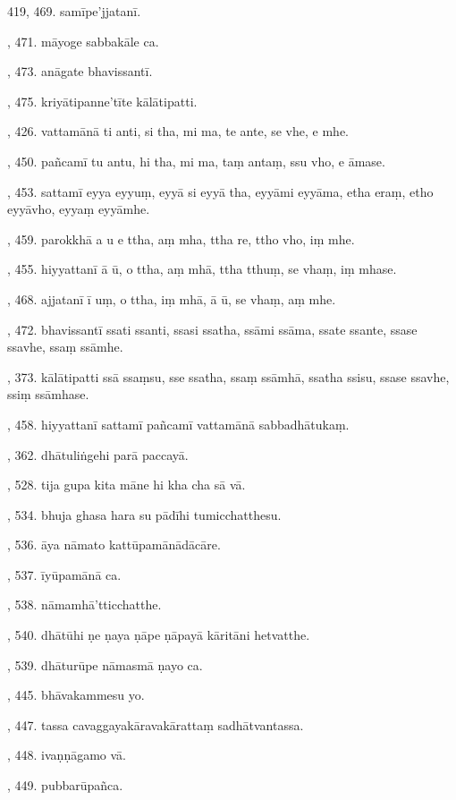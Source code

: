 419, 469. samīpe’jjatanī.\par {}, 471. māyoge sabbakāle ca.\par {}, 473. anāgate bhavissantī.\par {}, 475. kriyātipanne’tīte kālātipatti.\par {}, 426. vattamānā ti anti, si tha, mi ma, te ante, se vhe, e mhe.\par {}, 450. pañcamī tu antu, hi tha, mi ma, taṃ antaṃ, ssu vho, e āmase.\par {}, 453. sattamī eyya eyyuṃ, eyyā si eyyā tha, eyyāmi eyyāma, etha eraṃ, etho eyyāvho, eyyaṃ eyyāmhe.\par {}, 459. parokkhā a u e ttha, aṃ mha, ttha re, ttho vho, iṃ mhe.\par {}, 455. hiyyattanī ā ū, o ttha, aṃ mhā, ttha tthuṃ, se vhaṃ, iṃ mhase.\par {}, 468. ajjatanī ī uṃ, o ttha, iṃ mhā, ā ū, se vhaṃ, aṃ mhe.\par {}, 472. bhavissantī ssati ssanti, ssasi ssatha, ssāmi ssāma, ssate ssante, ssase ssavhe, ssaṃ ssāmhe.\par {}, 373. kālātipatti ssā ssaṃsu, sse ssatha, ssaṃ ssāmhā, ssatha ssisu, ssase ssavhe, ssiṃ ssāmhase.\par {}, 458. hiyyattanī sattamī pañcamī vattamānā sabbadhātukaṃ.\par {}, 362. dhātuliṅgehi parā paccayā.\par {}, 528. tija gupa kita māne hi kha cha sā vā.\par {}, 534. bhuja ghasa hara su pādīhi tumicchatthesu.\par {}, 536. āya nāmato kattūpamānādācāre.\par {}, 537. īyūpamānā ca.\par {}, 538. nāmamhā’tticchatthe.\par {}, 540. dhātūhi ṇe ṇaya ṇāpe ṇāpayā kāritāni hetvatthe.\par {}, 539. dhāturūpe nāmasmā ṇayo ca.\par {}, 445. bhāvakammesu yo.\par {}, 447. tassa cavaggayakāravakārattaṃ sadhātvantassa.\par {}, 448. ivaṇṇāgamo vā.\par {}, 449. pubbarūpañca.\par \noindent
